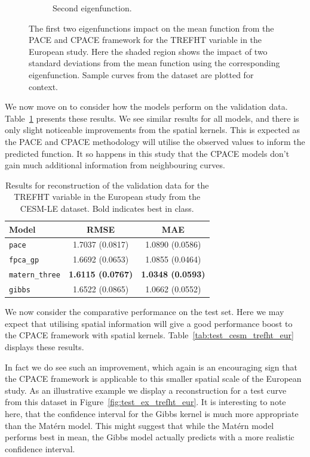 \begin{figure}
\begin{subfigure}[b]{0.45\textwidth}
		\caption{Second eigenfunction.}
		\label{fig:phi_2_trefht_eur}
	\end{subfigure}
	\caption{The first two eigenfunctions impact on the mean function from the PACE and CPACE framework for the TREFHT variable in the European study. Here the shaded region shows the impact of two standard deviations from the mean function using the corresponding eigenfunction. Sample curves from the dataset are plotted for context.}
	\label{fig:phi_trefht_eur}
\end{figure}

We now move on to consider how the models perform on the validation data.
Table~\ref{tab:train_cesm_trefht_eur} presents these results.
We see similar results for all models, and there is only slight noticeable improvements from the spatial kernels.
This is expected as the PACE and CPACE methodology will utilise the observed values to inform the predicted function.
It so happens in this study that the CPACE models don't gain much additional information from neighbouring curves. 

\begin{table}
	\caption[Results for TREFHT variable on validation data in the European study]{Results for reconstruction of the validation data for the TREFHT variable in the European study from the CESM-LE dataset. Bold indicates best in class.}
	\centering
	\label{tab:train_cesm_trefht_eur}
	\begin{tabular}{lcc}
		\toprule
		\textbf{Model} & \textbf{RMSE} & \textbf{MAE} \\
		\midrule
		\verb*|pace| & 1.7037 (0.0817) & 1.0890	(0.0586) \\
		\verb*|fpca_gp| & 1.6692 (0.0653) & 1.0855	(0.0464) \\
		\verb*|matern_three| & \textbf{1.6115 (0.0767)} & \textbf{1.0348	(0.0593)}\\
		\verb*|gibbs| & 1.6522	(0.0865) & 1.0662 (0.0552)\\
		\bottomrule
	\end{tabular}
\end{table}

We now consider the comparative performance on the test set.
Here we may expect that utilising spatial information will give a good performance boost to the CPACE framework with spatial kernels.
Table~\ref{tab:test_cesm_trefht_eur} displays these results.

In fact we do see such an improvement, which again is an encouraging sign that the CPACE framework is applicable to this smaller spatial scale of the European study.
As an illustrative example we display a reconstruction for a test curve from this dataset in Figure~\ref{fig:test_ex_trefht_eur}.
It is interesting to note here, that the confidence interval for the Gibbs kernel is much more appropriate than the Mat\'ern model. 
This might suggest that while the Mat\'ern model performs best in mean, the Gibbs model actually predicts with a more realistic confidence interval. 


